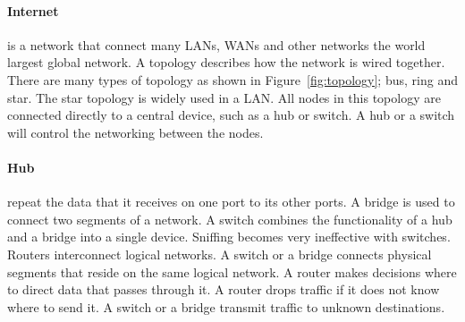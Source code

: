\documentclass[7x9]{times}
\begin{document}
\paragraph{Internet} is a network that connect many LANs,
WANs and other networks the world largest global network. A
topology describes how the network is wired together. There
are many types of topology as shown in
Figure~\ref{fig:topology}; bus, ring and star. The star
topology is widely used in a LAN. All nodes in this topology
are connected directly to a central device, such as a hub or
switch. A hub or a switch will control the networking
between the nodes.

\paragraph{Hub} repeat the data that it receives on one port
to its other ports. A bridge is used to connect two segments
of a network. A switch combines the functionality of a hub
and a bridge into a single device. Sniffing becomes very
ineffective with switches. Routers interconnect logical
networks. A switch or a bridge connects physical segments
that reside on the same logical network. A router makes
decisions where to direct data that passes through it. A
router drops traffic if it does not know where to send it. A
switch or a bridge transmit traffic to unknown destinations.



\end{document}
